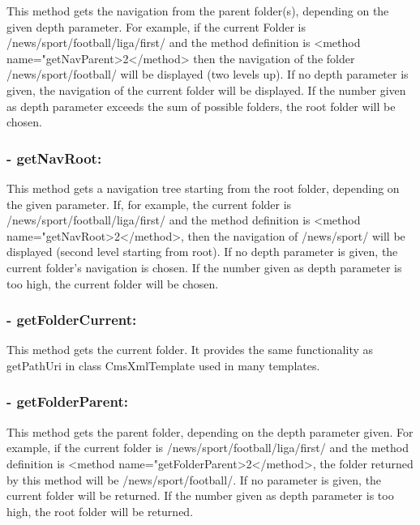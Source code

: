   This method gets the navigation from the parent folder(s), depending on the 
given depth parameter. For example, if the current Folder is 
{\dir /news/sport/football/liga/first/} and the method definition is 
{\tag <method name="getNavParent>2</method>} then the navigation of the folder 
{\dir /news/sport/football/} will be displayed (two levels up). If no depth 
parameter is given, the navigation of the current folder will be displayed. 
If the number given as depth parameter exceeds the sum of possible folders, 
the root folder will be chosen. \\


\subsubsection{- getNavRoot:} 

  This method gets a navigation tree starting from the root folder, depending 
on the given parameter. If, for example, the current folder is 
{\dir /news/sport/football/liga/first/} and the method definition is 
{\tag <method name="getNavRoot>2</method>}, then the navigation of 
{\dir /news/sport/} will be displayed (second level starting from root). 
If no depth parameter is given, the current folder's navigation is chosen. 
If the number given as depth parameter is too high, the current folder will be chosen. \\

\subsubsection{- getFolderCurrent:} 

This method gets the current folder. It provides the same functionality as {\name getPathUri} in class CmsXmlTemplate used in many templates. \\

\subsubsection{- getFolderParent:} 

 This method gets the parent folder, depending on the depth parameter given. For example, 
if the current folder is {\dir /news/sport/football/liga/first/} and the method 
definition is {\tag <me\-thod name="get\-Folder\-Parent>2\-</me\-thod>}, the folder 
returned by this method will be {\dir /news/sport/football/}. If no 
parameter is given, the current folder will be returned. If the number given as 
depth parameter is too high, the root folder will be returned. \\

